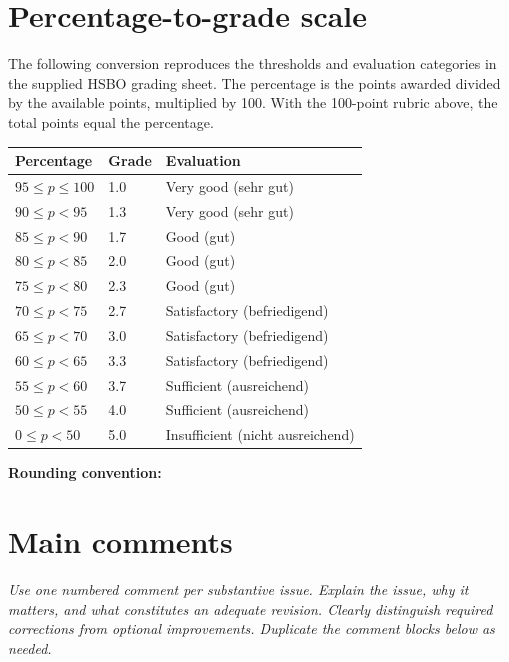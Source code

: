\section*{Percentage-to-grade scale}
\noindent The following conversion reproduces the thresholds and evaluation
categories in the supplied HSBO grading sheet. The percentage is the points
awarded divided by the available points, multiplied by 100. With the
100-point rubric above, the total points equal the percentage.

\begin{center}
\renewcommand{\arraystretch}{1.15}
\begin{tabular}{@{}lll@{}}
\hline
\textbf{Percentage} & \textbf{Grade} & \textbf{Evaluation} \\
\hline
\(95 \leq p \leq 100\) & 1.0 & Very good (sehr gut) \\
\(90 \leq p < 95\) & 1.3 & Very good (sehr gut) \\
\(85 \leq p < 90\) & 1.7 & Good (gut) \\
\(80 \leq p < 85\) & 2.0 & Good (gut) \\
\(75 \leq p < 80\) & 2.3 & Good (gut) \\
\(70 \leq p < 75\) & 2.7 & Satisfactory (befriedigend) \\
\(65 \leq p < 70\) & 3.0 & Satisfactory (befriedigend) \\
\(60 \leq p < 65\) & 3.3 & Satisfactory (befriedigend) \\
\(55 \leq p < 60\) & 3.7 & Sufficient (ausreichend) \\
\(50 \leq p < 55\) & 4.0 & Sufficient (ausreichend) \\
\(0 \leq p < 50\) & 5.0 & Insufficient (nicht ausreichend) \\
\hline
\end{tabular}
\end{center}

\noindent\textbf{Rounding convention:}

\section*{Main comments}
\noindent\textit{Use one numbered comment per substantive issue. Explain the
issue, why it matters, and what constitutes an adequate revision. Clearly
distinguish required corrections from optional improvements. Duplicate the
comment blocks below as needed.}

